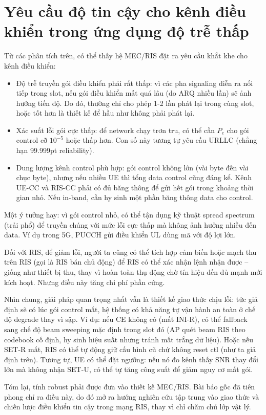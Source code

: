 \section{Yêu cầu độ tin cậy cho kênh điều khiển trong ứng dụng độ trễ thấp}

Từ các phân tích trên, có thể thấy hệ MEC/RIS đặt ra yêu cầu khắt khe cho kênh điều khiển:

\begin{itemize}
    \item Độ trễ truyền gói điều khiển phải rất thấp: vì các pha signaling diễn ra nối tiếp trong slot, nếu gói điều khiển mất quá lâu (do ARQ nhiều lần) sẽ ảnh hưởng tiến độ. Do đó, thường chỉ cho phép 1-2 lần phát lại trong cùng slot, hoặc tốt hơn là thiết kế để hầu như không phải phát lại.
    \item Xác suất lỗi gói cực thấp: để network chạy trơn tru, có thể cần $P_e$ cho gói control cỡ $10^{-5}$ hoặc thấp hơn. Con số này tương tự yêu cầu URLLC (chẳng hạn 99.999pt reliability).
    \item Dung lượng kênh control phù hợp: gói control không lớn (vài byte đến vài chục byte), nhưng nếu nhiều UE thì tổng data control cũng đáng kể. Kênh UE-CC và RIS-CC phải có đủ băng thông để gửi hết gói trong khoảng thời gian nhỏ. Nếu in-band, cần hy sinh một phần băng thông data cho control.
\end{itemize}

Một ý tưởng hay: vì gói control nhỏ, có thể tận dụng kỹ thuật spread spectrum (trải phổ) để truyền chúng với mức lỗi cực thấp mà không ảnh hưởng nhiều đến data. Ví dụ trong 5G, PUCCH gửi điều khiển UL dùng mã với độ lợi lớn.


Đối với RIS, để giảm lỗi, người ta cũng có thể tích hợp cảm biến hoặc mạch thu trên RIS (gọi là RIS bán chủ động) để RIS có thể xác nhận lệnh nhận được – giống như thiết bị thu, thay vì hoàn toàn thụ động chờ tín hiệu đến đủ mạnh mới kích hoạt. Nhưng điều này tăng chi phí phần cứng.


Nhìn chung, giải pháp quan trọng nhất vẫn là thiết kế giao thức chịu lỗi: tức giả định sẽ có lúc gói control mất, hệ thống có khả năng tự vận hành an toàn ở chế độ degrade thay vì sập. Ví dụ: nếu CE không có (mất INI-R), có thể fallback sang chế độ beam sweeping mặc định trong slot đó (AP quét beam RIS theo codebook cố định, hy sinh hiệu suất nhưng tránh mất trắng dữ liệu). Hoặc nếu SET-R mất, RIS có thể tự động giữ cấu hình cũ chứ không reset ctl (như ta giả định trên). Tương tự, UE có thể đặt ngưỡng: nếu nó đo kênh thấy SNR thay đổi lớn mà không nhận SET-U, có thể tự tăng công suất để giảm nguy cơ mất gói.


Tóm lại, tính robust phải được đưa vào thiết kế MEC/RIS. Bài báo gốc đã tiên phong chỉ ra điều này, do đó mở ra hướng nghiên cứu tập trung vào giao thức và chiến lược điều khiển tin cậy trong mạng RIS, thay vì chỉ chăm chú lớp vật lý.

